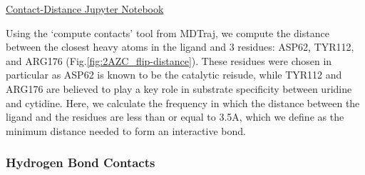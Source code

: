 \documentclass[fleqn,10pt]{wlscirep}
\begin{document}
\href{https://github.com/nathanmlim/Spitale/blob/master/manual_md/notebooks/contact-distance.ipynb}{Contact-Distance Jupyter Notebook}

Using the `compute contacts' tool from MDTraj, we compute the distance between the closest heavy atoms in the ligand and 3 residues: ASP62, TYR112, and ARG176 (Fig.\ref{fig:2AZC_flip-distance}).
These residues were chosen in particular as ASP62 is known to be the catalytic reisude, while TYR112 and ARG176 are believed to play a key role in substrate specificity between uridine and cytidine.
Here, we calculate the frequency in which the distance between the ligand and the residues are less than or equal to 3.5A, which we define as the minimum distance needed to form an interactive bond.

\subsubsection{Hydrogen Bond Contacts}
\end{document}
